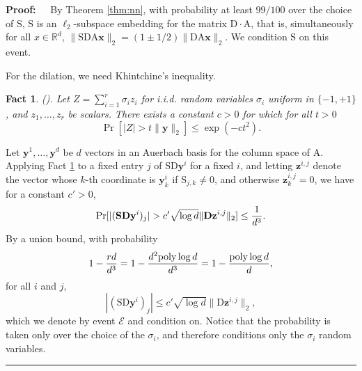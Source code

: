 \documentclass[11pt]{article}
\newenvironment{proof}{\begin{trivlist} \item {\bf Proof:~~}}
  {\qed\end{trivlist}}
\newcommand{\mat}[1]{{\ensuremath{\bm{\mathrm{#1}}}}}
\def\matA{\mat{A}}
\def\matD{\mat{D}}
\def\matS{\mat{S}}
\def\frac#1#2{{#1\over #2}}
\def\qed{\hfill\rule{2mm}{2mm}}
\def\x{{\mathbf x}}
\def\y{{\mathbf y}}
\def\z{{\mathbf z}}
\newcommand{\poly}{{\mathrm{poly}}}
\newtheorem{fact}{Fact}
\begin{document}
\begin{proof}
By Theorem \ref{thm:nn}, with probability at least $99/100$ over the choice of $\matS$, 
$\matS$ is an $\ell_2$-subspace embedding for the matrix $\matD \cdot \matA$, 
that is, simultaneously for all $x \in \mathbb{R}^d$,
$\|\matS \matD \matA \x\|_2 = (1 \pm 1/2) \|\matD \matA \x\|_2$. We condition $\matS$ on this event.

For the dilation, we need Khintchine's inequality.
\begin{fact}\label{fact:khintchine}(\cite{h81}). 
Let $Z = \sum_{i=1}^r \sigma_i z_i$ for i.i.d. random variables $\sigma_i$
uniform in $\{-1,+1\}$, and $z_1, \ldots, z_r$ be scalars. 
There exists a constant $c > 0$ for which for all $t > 0$
$$\Pr[|Z| > t \|\y\|_2] \leq \exp(-ct^2).$$
\end{fact}
Let $\y^1, \ldots, \y^d$ be $d$ vectors in an Auerbach basis for the column
space of $\matA$. 
Applying Fact \ref{fact:khintchine} to a fixed entry $j$ of $\matS \matD \y^i$ for a
fixed $i$, and letting $\z^{i,j}$ denote the vector whose $k$-th coordinate
is $\y^i_k$ if $\matS_{j,k} \neq 0$, and otherwise $\z^{i,j}_k = 0$, 
we have for a constant $c' > 0$, 
$$\Pr[|(\matS \matD \y^i)_j| > c' \sqrt{\log d} \|\matD \z^{i,j}\|_2] \leq \frac{1}{d^3}.$$
By a union bound, with probability 
$$1- \frac{r d}{d^3} = 1-\frac{d^2 \poly \log d}{d^3}
= 1- \frac{\poly \log d}{d},$$ for all $i$ and $j$,
$$|(\matS \matD \y^i)_j| \leq c' \sqrt{\log d} \|\matD \z^{i,j}\|_2,$$
which we denote by event $\mathcal{E}$ and condition on. 
Notice that the probability is taken only over
the choice of the $\sigma_i$, and therefore conditions only the $\sigma_i$ random variables. 


\end{proof}
\end{document}
